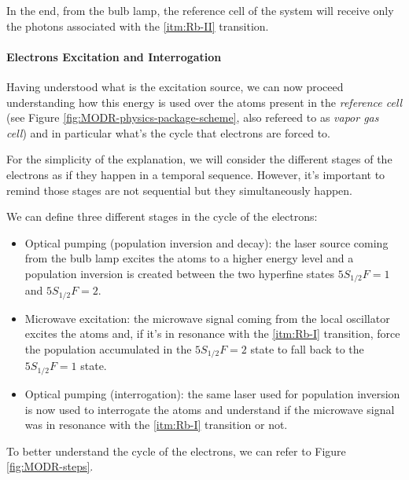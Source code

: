 In the end, from the bulb lamp, the reference cell of the system will receive only the photons associated with the \ref{itm:Rb-II} transition.


\paragraph{Electrons Excitation and Interrogation}

Having understood what is the excitation source, we can now proceed understanding how this energy is used over the atoms present in the \textit{reference cell} (see Figure \ref{fig:MODR-physics-package-scheme}, also refereed to as \textit{vapor gas cell}) and in particular what's the cycle that electrons are forced to.

For the simplicity of the explanation, we will consider the different stages of the electrons as if they happen in a temporal sequence.
However, it's important to remind those stages are not sequential but they simultaneously happen.

We can define three different stages in the cycle of the electrons:

\begin{itemize}
    \item Optical pumping (population inversion and decay): the laser source coming from the bulb lamp excites the atoms to a higher energy level and a population inversion is created between the two hyperfine states $5S_{1/2} F=1$ and $5S_{1/2} F=2$.
    \item Microwave excitation: the microwave signal coming from the local oscillator excites the atoms and, if it's in resonance with the \ref{itm:Rb-I} transition, force the population accumulated in the $5S_{1/2} F=2$ state to fall back to the $5S_{1/2} F=1$ state.
    \item Optical pumping (interrogation): the same laser used for population inversion is now used to interrogate the atoms and understand if the microwave signal was in resonance with the \ref{itm:Rb-I} transition or not.
\end{itemize}

To better understand the cycle of the electrons, we can refer to Figure \ref{fig:MODR-steps}.


